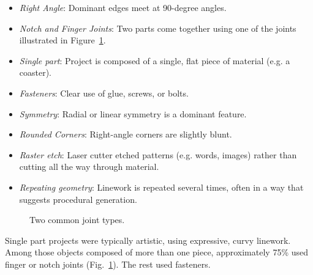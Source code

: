 \documentclass{article}
\begin{document}
\begin{itemize}
\item \textit{Right Angle}: Dominant edges meet at 90-degree angles.
\item \textit{Notch and Finger Joints}: Two parts come together using one of
  the joints illustrated in Figure~\ref{fig:joint}.
\item \textit{Single part}: Project is composed of a single, flat piece of
  material (e.g. a coaster).
\item \textit{Fasteners}: Clear use of glue, screws, or bolts.
\item \textit{Symmetry}: Radial or linear symmetry is a dominant feature.
\item \textit{Rounded Corners}: Right-angle corners are slightly blunt.
\item \textit{Raster etch}: Laser cutter etched patterns (e.g. words,
  images) rather than cutting all the way through material.
\item \textit{Repeating geometry}: Linework is repeated several times,
  often in a way that suggests procedural generation.
\end{itemize}

\begin{figure}[h]
\centering 
{}
\caption{Two common joint types.}
\label{fig:joint}
\end{figure}

Single part projects were typically artistic, using expressive, curvy
linework. Among those objects composed of more than one piece,
approximately 75\% used finger or notch joints
(Fig.~\ref{fig:joint}). The rest used fasteners.
\end{document}

